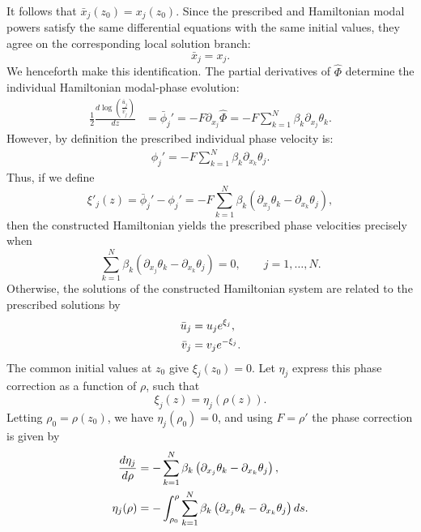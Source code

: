 \documentclass[11pt,a4paper]{article}
\numberwithin{equation}{section}
\begin{document}
It follows that $\bar{x}_j(z_0)=x_j(z_0)$. Since the prescribed and Hamiltonian modal powers satisfy the same differential equations with the same initial values, they agree on the corresponding local solution branch:
\begin{equation}
    \bar{x}_j=x_j.
\end{equation}
We henceforth make this identification. The partial derivatives of $\hat{\Phi}$ determine the individual Hamiltonian modal-phase evolution:
\begin{align}
    \frac{1}{2}\frac{d \log{\left(\frac{\bar{u}_j}{\bar{v}_j}\right)}}{dz} &= \bar{\phi}_j' = -F\partial_{x_j}\hat{\Phi} = -F\sum_{k=1}^{N}\beta_k\partial_{x_j}\theta_k. \label{eq:eoms-fhat-phihat-pow-phi}
\end{align}
However, by definition the prescribed individual phase velocity is:
\begin{align}
    \phi_j' = -F\sum_{k=1}^{N}\beta_k\partial_{x_k}\theta_j. \label{eq:prescribed-pow-phi}
\end{align}
Thus, if we define
\begin{equation}
    \xi'_j(z) = \bar{\phi}_j' - \phi_j' = -F\sum_{k=1}^{N}\beta_k\left(\partial_{x_j}\theta_k - \partial_{x_k}\theta_j\right),
\end{equation}
then the constructed Hamiltonian yields the prescribed phase velocities precisely when
\begin{equation}
    \sum_{k=1}^{N}\beta_k\left(\partial_{x_j}\theta_k-\partial_{x_k}\theta_j\right)=0,
    \qquad j=1,\dots,N.
\end{equation}
Otherwise, the solutions of the constructed Hamiltonian system are related to the prescribed solutions by
\begin{align}
    \bar{u}_j&=u_je^{\xi_j}, \notag \\
    \bar{v}_j&=v_je^{-\xi_j}. \label{eq:ubar-vbar-to-u-v-xi-j}
\end{align}
The common initial values at $z_0$ give $\xi_j(z_0)=0$. Let $\eta_j$ express this phase correction as a function of $\rho$, such that
\begin{equation}
    \xi_j(z)=\eta_j(\rho(z)).
\end{equation}
Letting $\rho_0=\rho(z_0)$, we have $\eta_j(\rho_0)=0$, and using $F=\rho'$ the phase correction is given by
\begin{align}
    \frac{d \eta_j}{d \rho} &= -\sum_{k=1}^{N}\beta_k\left(\partial_{x_j}\theta_k - \partial_{x_k}\theta_j\right), \notag \\
    \eta_j(\rho) &= - \int_{\rho_0}^{\rho}
    \sum_{k=1}^{N}\beta_k\left(\partial_{x_j}\theta_k - \partial_{x_k}\theta_j\right)
    ds. \label{eq:eta-j-rho-quadrature}
\end{align}
\end{document}

